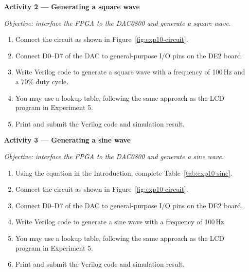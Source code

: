 \begin{procedure}
  \textbf{Activity 2 --- Generating a square wave}\vspace{2pt}

  \textit{Objective: interface the FPGA to the DAC0800 and generate a square wave.}

  \begin{enumerate}
    \item Connect the circuit as shown in Figure~\ref{fig:exp10-circuit}.
    \item Connect D0--D7 of the DAC to general-purpose I/O pins on the DE2 board.
    \item Write Verilog code to generate a square wave with a frequency of 100\,Hz and a 70\% duty cycle.
    \item You may use a lookup table, following the same approach as the LCD program in Experiment 5.
    \item Print and submit the Verilog code and simulation result.
  \end{enumerate}

  \textbf{Activity 3 --- Generating a sine wave}\vspace{2pt}

  \textit{Objective: interface the FPGA to the DAC0800 and generate a sine wave.}

  \begin{enumerate}
    \item Using the equation in the Introduction, complete Table~\ref{tab:exp10-sine}.
    \item Connect the circuit as shown in Figure~\ref{fig:exp10-circuit}.
    \item Connect D0--D7 of the DAC to general-purpose I/O pins on the DE2 board.
    \item Write Verilog code to generate a sine wave with a frequency of 100\,Hz.
    \item You may use a lookup table, following the same approach as the LCD program in Experiment 5.
    \item Print and submit the Verilog code and simulation result.
  \end{enumerate}


\end{procedure}
